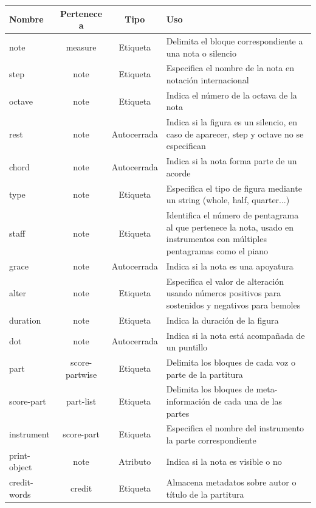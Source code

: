  \begin{center}
 	\newcommand*{\TitleParbox}[1]{\parbox[c]{1.75cm}{\raggedright #1}}%
 	\begin{longtable}{ | l | c | c | p{6.5cm} | }
 		\hline
 		Nombre & Pertenece a & Tipo & Uso \\ \hline \hline
 		note & measure & Etiqueta & Delimita el bloque correspondiente a una nota o silencio \\ \hline
 		step & note & Etiqueta &  Especifica el nombre de la nota en notación internacional \\ \hline
 		octave & note & Etiqueta &  Indica el número de la octava de la nota \\ \hline
 		rest & note & Autocerrada & Indica si la figura es un silencio, en caso de aparecer, step y octave no se especifican \\ \hline
 		chord & note & Autocerrada & Indica si la nota forma parte de un acorde \\ \hline
 		type & note & Etiqueta & Especifica el tipo de figura mediante un string (whole, half, quarter...) \\ \hline
 		staff & note & Etiqueta & Identifica el número de pentagrama al que pertenece la nota, usado en instrumentos con múltiples pentagramas como el piano \\ \hline
 		grace & note & Autocerrada & Indica si la nota es una apoyatura \\ \hline
 		alter & note & Etiqueta & Especifica el valor de alteración usando números positivos para sostenidos y negativos para bemoles \\ \hline
 		duration & note & Etiqueta & Indica la duración de la figura \\ \hline
 		dot & note & Autocerrada & Indica si la nota está acompañada de un puntillo \\ \hline
 		part & score-partwise & Etiqueta & Delimita los bloques de cada voz o parte de la partitura \\ \hline
 		score-part & part-list & Etiqueta & Delimita los bloques de meta-información de cada una de las partes \\ \hline
 		instrument & score-part & Etiqueta & Especifica el nombre del instrumento la parte correspondiente \\ \hline
 		print-object & note & Atributo & Indica si la nota es visible o no \\ \hline
 		credit-words & credit & Etiqueta & Almacena metadatos sobre autor o título de la partitura \\ \hline

\end{longtable}
\end{center}
